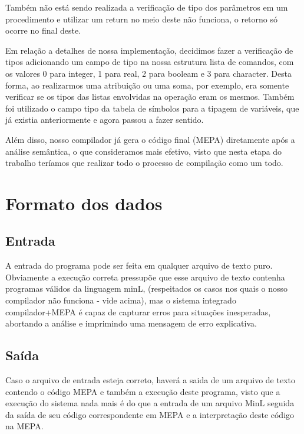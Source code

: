 \documentclass[a4paper,12pt]{article}
\begin{document}
Também não está sendo realizada a verificação de tipo dos parâmetros em um procedimento e utilizar um return no meio deste não funciona, o retorno só ocorre no final deste.

Em relação a detalhes de nossa implementação, decidimos fazer a verificação de tipos adicionando um campo de tipo na nossa estrutura lista de comandos, com os valores 0 para integer, 1 para real, 2 para booleam e 3 para character. Desta forma, ao realizarmos uma atribuição ou uma soma, por exemplo, era somente verificar se os tipos das listas envolvidas na operação eram os mesmos. Também foi utilizado o campo tipo da tabela de símbolos para a tipagem de variáveis, que já existia anteriormente e agora passou a fazer sentido. 

Além disso, nosso compilador já gera o código final (MEPA) diretamente após a análise semântica, o que consideramos mais efetivo, visto que nesta etapa do trabalho teríamos que realizar todo o processo de compilação como um todo.

\section{Formato dos dados}
\subsection{Entrada}
A entrada do programa pode ser feita em qualquer arquivo de texto puro. Obviamente a execução correta pressupõe que esse arquivo de texto contenha programas válidos da linguagem minL, (respeitados os casos nos quais o nosso compilador não funciona - vide acima), mas o sistema integrado compilador+MEPA é capaz de capturar erros para situações inesperadas, abortando a análise e imprimindo uma mensagem de erro explicativa.

\subsection{Saída}
Caso o arquivo de entrada esteja correto, haverá a saida de um arquivo de texto contendo o código MEPA e também a execução deste programa, visto que a execução do sistema nada mais é do que a entrada de um arquivo MinL seguida da saída de seu código correspondente em MEPA e a interpretação deste código na MEPA.
\end{document}
